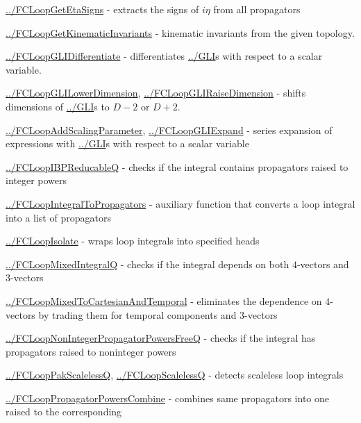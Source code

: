 \documentclass[../FeynCalcManual.tex]{subfiles}
\begin{document}
\begin{itemize}
{\item
  \hyperlink{../fcloopgetetasigns}{../FCLoopGetEtaSigns} - extracts the
  signs of \(i \eta\) from all propagators
\item
  \hyperlink{../fcloopgetkinematicinvariants}{../FCLoopGetKinematicInvariants}
  - kinematic invariants from the given topology.
\item
  \hyperlink{../fcloopglidifferentiate}{../FCLoopGLIDifferentiate} -
  differentiates \hyperlink{../gli}{../GLI}s with respect to a scalar
  variable.
\item
  \hyperlink{../fcloopglilowerdimension}{../FCLoopGLILowerDimension},
  \hyperlink{../fcloopgliraisedimension}{../FCLoopGLIRaiseDimension} -
  shifts dimensions of \hyperlink{../gli}{../GLI}s to \(D-2\) or
  \(D+2\).
\item
  \hyperlink{../fcloopaddscalingparameter}{../FCLoopAddScalingParameter},
  \hyperlink{../fcloopgliexpand}{../FCLoopGLIExpand} - series expansion
  of expressions with \hyperlink{../gli}{../GLI}s with respect to a
  scalar variable
\item
  \hyperlink{../fcloopibpreducableq}{../FCLoopIBPReducableQ} - checks if
  the integral contains propagators raised to integer powers
\item
  \hyperlink{../fcloopintegraltopropagators}{../FCLoopIntegralToPropagators}
  - auxiliary function that converts a loop integral into a list of
  propagators
\item
  \hyperlink{../fcloopisolate}{../FCLoopIsolate} - wraps loop integrals
  into specified heads
\item
  \hyperlink{../fcloopmixedintegralq}{../FCLoopMixedIntegralQ} - checks
  if the integral depends on both \(4\)-vectors and \(3\)-vectors
\item
  \hyperlink{../fcloopmixedtocartesianandtemporal}{../FCLoopMixedToCartesianAndTemporal}
  - eliminates the dependence on \(4\)-vectors by trading them for
  temporal components and \(3\)-vectors
\item
  \hyperlink{../fcloopnonintegerpropagatorpowersfreeq}{../FCLoopNonIntegerPropagatorPowersFreeQ}
  - checks if the integral has propagators raised to noninteger powers
\item
  \hyperlink{../fclooppakscalelessq}{../FCLoopPakScalelessQ},
  \hyperlink{../fcloopscalelessq}{../FCLoopScalelessQ} - detects
  scaleless loop integrals
\item
  \hyperlink{../fclooppropagatorpowerscombine}{../FCLoopPropagatorPowersCombine}
  - combines same propagators into one raised to the corresponding
}
\end{itemize}
\end{document}
